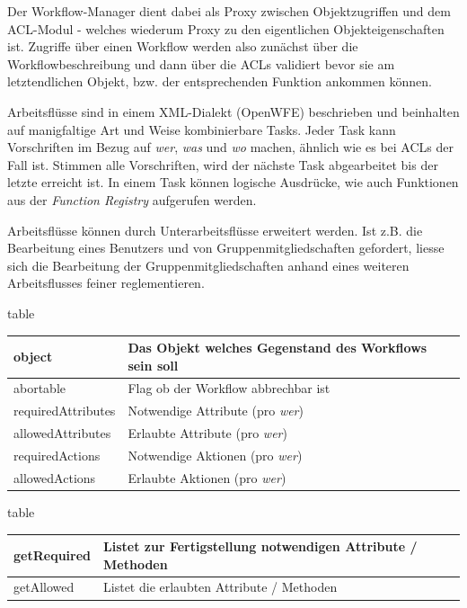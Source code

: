 Der Workflow-Manager dient dabei als Proxy zwischen Objektzugriffen und
dem ACL-Modul - welches wiederum Proxy zu den eigentlichen Objekteigenschaften
ist. Zugriffe über einen Workflow werden also zunächst über die Workflowbeschreibung
und dann über die ACLs validiert bevor sie am letztendlichen Objekt, bzw.
der entsprechenden Funktion ankommen können.

Arbeitsflüsse sind in einem XML-Dialekt (OpenWFE) beschrieben und beinhalten
auf manigfaltige Art und Weise kombinierbare Tasks. Jeder Task kann
Vorschriften im Bezug auf \textit{wer}, \textit{was} und \textit{wo} machen,
ähnlich wie es bei ACLs der Fall ist. Stimmen alle Vorschriften, wird
der nächste Task abgearbeitet bis der letzte erreicht ist. In einem Task
können logische Ausdrücke, wie auch Funktionen aus der \textit{Function Registry}
aufgerufen werden.

Arbeitsflüsse können durch Unterarbeitsflüsse erweitert werden. Ist z.B.
die Bearbeitung eines Benutzers und von Gruppenmitgliedschaften gefordert,
liesse sich die Bearbeitung der Gruppenmitgliedschaften anhand eines
weiteren Arbeitsflusses feiner reglementieren.

\begin{nofloat}{table}
 \begin{center}
  \begin{tabularx}{\textwidth}[]{|X|X|}
   \hline
   object               & Das Objekt welches Gegenstand des Workflows sein soll \\
   \hline
   abortable            & Flag ob der Workflow abbrechbar ist \\
   \hline
   requiredAttributes   & Notwendige Attribute (pro \textit{wer}) \\
   \hline
   allowedAttributes    & Erlaubte Attribute (pro \textit{wer})\\
   \hline
   requiredActions      & Notwendige Aktionen (pro \textit{wer})\\
   \hline
   allowedActions       & Erlaubte Aktionen (pro \textit{wer})\\
   \hline
  \end{tabularx}
 \end{center}
\end{nofloat}

\begin{nofloat}{table}
 \begin{center}
  \begin{tabularx}{\textwidth}[]{|X|X|}
   \hline
   getRequired      & Listet zur Fertigstellung notwendigen Attribute / Methoden\\
   \hline
   getAllowed       & Listet die erlaubten Attribute / Methoden\\
   \hline
  \end{tabularx}
 \end{center}
\end{nofloat}

